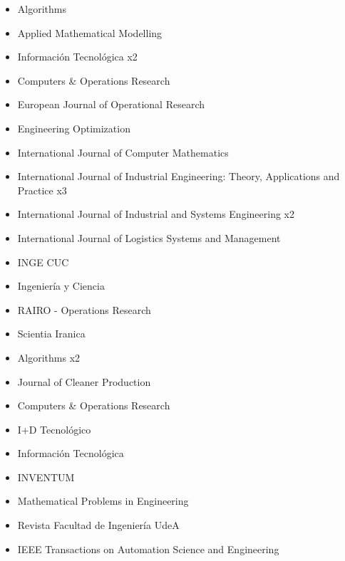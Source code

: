 {\begin{itemize}
\item Algorithms
\item Applied Mathematical Modelling
\item Informaci\'on Tecnol\'ogica x2
\item Computers \& Operations Research
\item European Journal of Operational Research
\item Engineering Optimization
\item International Journal of Computer Mathematics
\item International Journal of Industrial Engineering: Theory, Applications and Practice x3
\item International Journal of Industrial and Systems Engineering x2
\item International Journal of Logistics Systems and Management 
\item INGE CUC
\item Ingenier\'ia y Ciencia
\item RAIRO - Operations Research
\item Scientia Iranica
\end{itemize}
}

{\begin{itemize}
\item Algorithms x2
\item Journal of Cleaner Production
\item Computers \& Operations Research
\item I+D Tecnol\'ogico
\item Informaci\'on Tecnol\'ogica
\item INVENTUM
\item Mathematical Problems in Engineering
\item Revista Facultad de Ingenier\'ia UdeA
\item IEEE Transactions on Automation Science and Engineering
\end{itemize}
}

